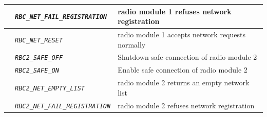 \begin{itemize}
\begin{longtable}{|l|l|l|}
				\hline

				&	\begin{minipage}[t]{0.40\linewidth} \emph{\texttt{RBC\_NET\_FAIL\_REGISTRATION}} \end{minipage}
				&	\begin{minipage}[t]{0.38\linewidth} radio module 1 refuses network registration \end{minipage} \\

				\hline

				&	\begin{minipage}[t]{0.40\linewidth} \emph{\texttt{RBC\_NET\_RESET}} \end{minipage}
				&	\begin{minipage}[t]{0.38\linewidth} radio module 1 accepts network requests normally \end{minipage} \\

				\hline

				&	\begin{minipage}[t]{0.40\linewidth} \emph{\texttt{RBC2\_SAFE\_OFF}} \end{minipage}
				&	\begin{minipage}[t]{0.38\linewidth} Shutdown safe connection of radio module 2 \end{minipage} \\

				\hline

				&	\begin{minipage}[t]{0.40\linewidth} \emph{\texttt{RBC2\_SAFE\_ON}} \end{minipage}
				&	\begin{minipage}[t]{0.38\linewidth} Enable safe connection of radio module 2 \end{minipage} \\

				\hline

				&	\begin{minipage}[t]{0.40\linewidth} \emph{\texttt{RBC2\_NET\_EMPTY\_LIST}} \end{minipage}
				&	\begin{minipage}[t]{0.38\linewidth} radio module 2 returns an empty network list \end{minipage} \\

				\hline

				&	\begin{minipage}[t]{0.40\linewidth} \emph{\texttt{RBC2\_NET\_FAIL\_REGISTRATION}} \end{minipage}
				&	\begin{minipage}[t]{0.38\linewidth} radio module 2 refuses network registration \end{minipage} \\


\end{longtable}
\end{itemize}
